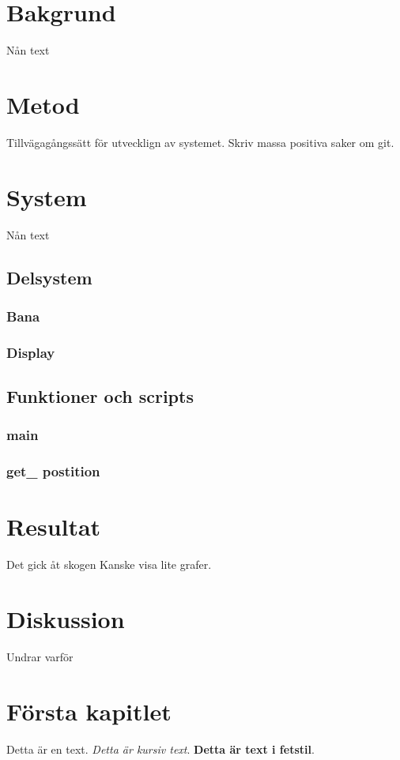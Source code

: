 \documentclass[10pt,oneside,swedish]{lips-no_customer}
\begin{document}
\clearpage

\section{Bakgrund}
Nån text

\section{Metod}
Tillvägagångssätt för utvecklign av systemet. Skriv massa positiva saker om git.
\section{System}
 Nån text
	\subsection{Delsystem}
		\subsubsection{Bana}
		\subsubsection{Display}
	\subsection{Funktioner och scripts}
		\subsubsection{main}
		\subsubsection{get\_ postition}

\section{Resultat}
Det gick åt skogen
Kanske visa lite grafer.

\section{Diskussion}
Undrar varför


\cleardoublepage

\section{Första kapitlet}
Detta är en text. \emph{Detta är kursiv text}. \textbf{Detta är text i
  fetstil}.
\end{document}
